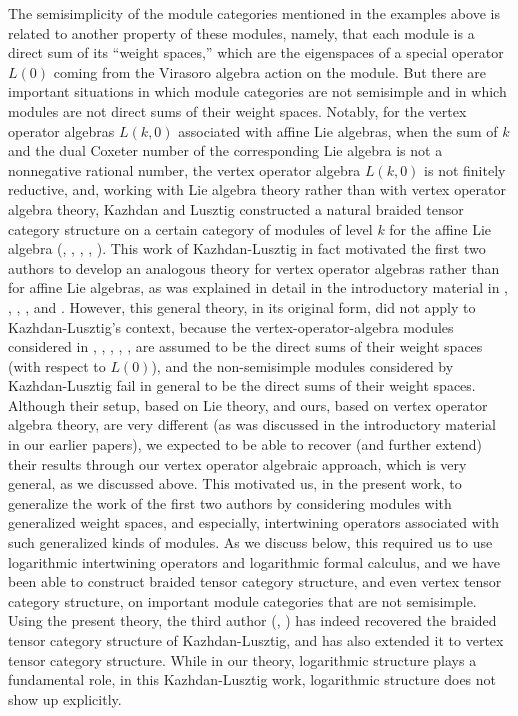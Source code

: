 \documentclass[12pt]{article}
\begin{document}
The semisimplicity of the module categories mentioned in the examples
above is related to another property of these modules, namely, that
each module is a direct sum of its ``weight spaces,'' which are the
eigenspaces of a special operator $L(0)$ coming {}from the Virasoro
algebra action on the module.  But there are important situations in
which module categories are not semisimple and in which modules are
not direct sums of their weight spaces.  Notably, for the vertex
operator algebras $L(k,0)$ associated with affine Lie algebras, when
the sum of $k$ and the dual Coxeter number of the corresponding Lie
algebra is not a nonnegative rational number, the vertex operator
algebra $L(k,0)$ is not finitely reductive, and, working with Lie
algebra theory rather than with vertex operator algebra theory,
Kazhdan and Lusztig constructed a natural braided tensor category
structure on a certain category of modules of level $k$ for the affine
Lie algebra (\cite{KL1}, \cite{KL2}, \cite{KL3}, \cite{KL4},
\cite{KL5}).  This work of Kazhdan-Lusztig in fact motivated the first
two authors to develop an analogous theory for vertex operator
algebras rather than for affine Lie algebras, as was explained in
detail in the introductory material in \cite{tensorAnnounce},
\cite{tensorK}, \cite{tensor1}, \cite{tensor2}, and \cite{HLaffine}.
However, this general theory, in its original form, did not apply to
Kazhdan-Lusztig's context, because the vertex-operator-algebra modules
considered in \cite{tensorAnnounce}, \cite{tensorK}, \cite{tensor1},
\cite{tensor2}, \cite{tensor3}, \cite{tensor4} are assumed to be the
direct sums of their weight spaces (with respect to $L(0)$), and the
non-semisimple modules considered by Kazhdan-Lusztig fail in general
to be the direct sums of their weight spaces.  Although their setup,
based on Lie theory, and ours, based on vertex operator algebra
theory, are very different (as was discussed in the introductory
material in our earlier papers), we expected to be able to recover
(and further extend) their results through our vertex operator
algebraic approach, which is very general, as we discussed above.
This motivated us, in the present work, to generalize the work of the
first two authors by considering modules with generalized weight
spaces, and especially, intertwining operators associated with such
generalized kinds of modules.  As we discuss below, this required us
to use logarithmic intertwining operators and logarithmic formal
calculus, and we have been able to construct braided tensor category
structure, and even vertex tensor category structure, on important
module categories that are not semisimple.  Using the present theory,
the third author (\cite{Z1}, \cite{Z2}) has indeed recovered the
braided tensor category structure of Kazhdan-Lusztig, and has also
extended it to vertex tensor category structure.  While in our theory,
logarithmic structure plays a fundamental role, in this
Kazhdan-Lusztig work, logarithmic structure does not show up
explicitly.
\end{document}
